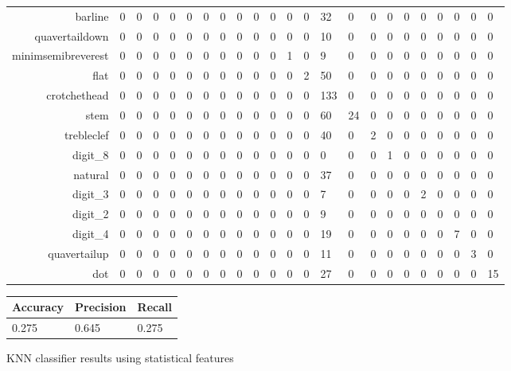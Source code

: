 \begin{figure}
\begin{subtable}[b]{\linewidth}
\begin{tabularx}{\textwidth}{r|XXXXXXXXXXXXXXXXXXXXXX}
    barline & 0 & 0 & 0 & 0 & 0 & 0 & 0 & 0 & 0 & 0 & 0 & 0 & 32 & 0 & 0 & 0 & 0 & 0 & 0 & 0 & 0 & 0 \\
    quavertaildown & 0 & 0 & 0 & 0 & 0 & 0 & 0 & 0 & 0 & 0 & 0 & 0 & 10 & 0 & 0 & 0 & 0 & 0 & 0 & 0 & 0 & 0 \\
    minimsemibreverest & 0 & 0 & 0 & 0 & 0 & 0 & 0 & 0 & 0 & 0 & 1 & 0 & 9 & 0 & 0 & 0 & 0 & 0 & 0 & 0 & 0 & 0 \\
    flat & 0 & 0 & 0 & 0 & 0 & 0 & 0 & 0 & 0 & 0 & 0 & 2 & 50 & 0 & 0 & 0 & 0 & 0 & 0 & 0 & 0 & 0 \\
    crotchethead & 0 & 0 & 0 & 0 & 0 & 0 & 0 & 0 & 0 & 0 & 0 & 0 & 133 & 0 & 0 & 0 & 0 & 0 & 0 & 0 & 0 & 0 \\
    stem & 0 & 0 & 0 & 0 & 0 & 0 & 0 & 0 & 0 & 0 & 0 & 0 & 60 & 24 & 0 & 0 & 0 & 0 & 0 & 0 & 0 & 0 \\
    trebleclef & 0 & 0 & 0 & 0 & 0 & 0 & 0 & 0 & 0 & 0 & 0 & 0 & 40 & 0 & 2 & 0 & 0 & 0 & 0 & 0 & 0 & 0 \\
    digit\_8 & 0 & 0 & 0 & 0 & 0 & 0 & 0 & 0 & 0 & 0 & 0 & 0 & 0 & 0 & 0 & 1 & 0 & 0 & 0 & 0 & 0 & 0 \\
    natural & 0 & 0 & 0 & 0 & 0 & 0 & 0 & 0 & 0 & 0 & 0 & 0 & 37 & 0 & 0 & 0 & 0 & 0 & 0 & 0 & 0 & 0 \\
    digit\_3 & 0 & 0 & 0 & 0 & 0 & 0 & 0 & 0 & 0 & 0 & 0 & 0 & 7 & 0 & 0 & 0 & 0 & 2 & 0 & 0 & 0 & 0 \\
    digit\_2 & 0 & 0 & 0 & 0 & 0 & 0 & 0 & 0 & 0 & 0 & 0 & 0 & 9 & 0 & 0 & 0 & 0 & 0 & 0 & 0 & 0 & 0 \\
    digit\_4 & 0 & 0 & 0 & 0 & 0 & 0 & 0 & 0 & 0 & 0 & 0 & 0 & 19 & 0 & 0 & 0 & 0 & 0 & 0 & 7 & 0 & 0 \\
    quavertailup & 0 & 0 & 0 & 0 & 0 & 0 & 0 & 0 & 0 & 0 & 0 & 0 & 11 & 0 & 0 & 0 & 0 & 0 & 0 & 0 & 3 & 0 \\
    dot & 0 & 0 & 0 & 0 & 0 & 0 & 0 & 0 & 0 & 0 & 0 & 0 & 27 & 0 & 0 & 0 & 0 & 0 & 0 & 0 & 0 & 15 \\
    \end{tabularx}
  \end{subtable}

  \vspace{0.8cm}

  \begin{subtable}[b]{.4\linewidth}
    \begin{tabularx}{\linewidth}{lll}
      \toprule
      Accuracy & Precision & Recall \\
      \midrule
      0.275 & 0.645 & 0.275 \\
      \bottomrule
    \end{tabularx}
  \end{subtable}

  \caption{KNN classifier results using statistical features}
  \label{fig:knn-stats}
\end{figure}


